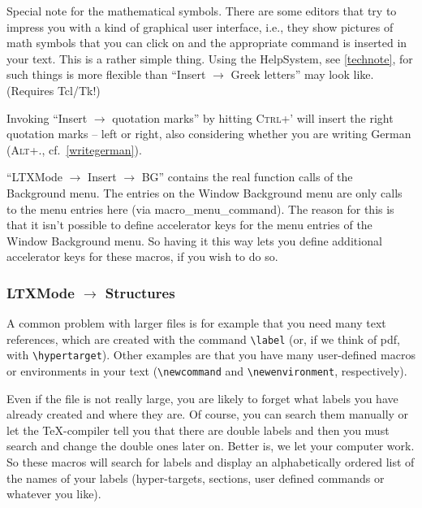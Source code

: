 \documentclass{article}
\newcommand{\keyname}[1]{\textsc{#1}}
\newcommand{\menu}[1]{``#1''}
\begin{document}
Special note for the mathematical symbols. There are some editors that try to impress you with a kind of graphical user interface, i.e., they show pictures of math symbols that you can click on and the appropriate command is inserted in your text. This is a rather simple thing. Using the HelpSystem, see \ref{technote},  for such things is more flexible than \menu{Insert $\to$ Greek letters} may look like. (Requires Tcl/Tk!) 

Invoking \menu{Insert $\to$ quotation marks} by hitting \keyname{Ctrl+'} will insert the right quotation marks -- left or right, also considering whether you are writing German (\keyname{Alt+.}, cf.~\ref{writegerman}). 

\menu{LTXMode $\to$ Insert $\to$ BG} contains the real function calls of the Background menu. The entries on the Window Background menu are only calls to the menu entries here (via macro\_menu\_command). The reason for this is that it isn't possible to define accelerator keys for the menu entries of the Window Background menu. So having it this way lets you define additional accelerator keys for these macros, if you wish to do so.

\subsubsection{LTXMode $\to$ Structures}\label{labels}
A common problem with larger files is for example that you need many text references, which are created with the command \verb|\label| (or, if we think of pdf, with \verb|\hypertarget|). Other examples are that you have many user-defined macros or environments in your text (\verb|\newcommand| and \verb|\newenvironment|, respectively).

Even if the file is not really large, you are likely to forget what labels you have already created and where they are. Of course, you can search them manually or let the \TeX-compiler tell you that there are double labels and then you must search and change the double ones later on. 
Better is, we let your computer work. So these macros will search for labels and display an alphabetically ordered list of the names of your labels (hyper-targets, sections, user defined commands or whatever you like).
\end{document}
